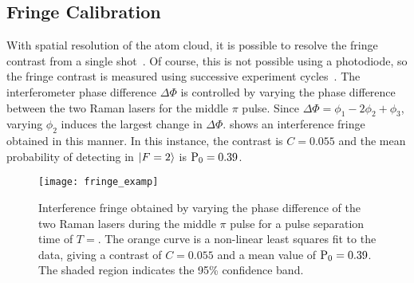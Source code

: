 \subsection{Fringe Calibration}\label{sec:fringe_cal}
With spatial resolution of the atom cloud, it is possible to resolve
the fringe contrast from a single shot~\cite{Sugarbaker2013}. Of
course, this is not possible using a photodiode, so the fringe
contrast is measured using successive experiment
cycles~\cite{Peters2001}. 
The interferometer phase difference $\Delta \Phi$ is controlled 
by varying the phase difference between the two Raman lasers for the
middle \(\pi\) pulse. Since \(\Delta \Phi = \phi_1 - 2\phi_2
+\phi_3\), varying \(\phi_2\) induces the largest change in
\(\Delta\Phi\).  shows an interference fringe obtained in this
manner. In this instance, the contrast is \(C = 0.055\) and the mean
probability of detecting in \(\ket{F=2}\) is \(\textnormal{P}_0 =
0.39\).
\begin{figure}[htpb!]
  \centering
  \texttt{[image: fringe\_examp]}
  \caption[Interference fringe for \(T = \).]{Interference fringe obtained by varying the phase
    difference of the two Raman lasers during the middle \(\pi\) pulse
    for a pulse separation time of \(T = \). The orange
curve is a non-linear least squares fit to the data, giving a contrast
of \(C = 0.055\) and a mean value of \(\textnormal{P}_0 = 0.39\). The
shaded region indicates the 95\% confidence band. }
  \label{fig:fringe_examp}
\end{figure}


